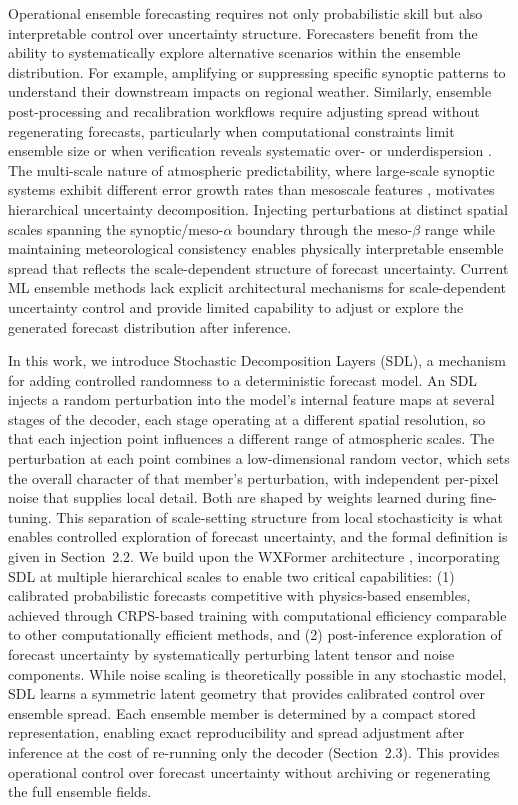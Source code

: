 \documentclass{agujournal2019}
\begin{document}
Operational ensemble forecasting requires not only probabilistic skill but also interpretable control over uncertainty structure. Forecasters benefit from the ability to systematically explore alternative scenarios within the ensemble distribution. For example, amplifying or suppressing specific synoptic patterns to understand their downstream impacts on regional weather. Similarly, ensemble post-processing and recalibration workflows require adjusting spread without regenerating forecasts, particularly when computational constraints limit ensemble size or when verification reveals systematic over- or underdispersion \cite{hamill1997verification, vannitsem2021statistical}. The multi-scale nature of atmospheric predictability, where large-scale synoptic systems exhibit different error growth rates than mesoscale features \cite{tribbia2004scale}, motivates hierarchical uncertainty decomposition. Injecting perturbations at distinct spatial scales spanning the synoptic/meso-$\alpha$ boundary through the meso-$\beta$ range while maintaining meteorological consistency enables physically interpretable ensemble spread that reflects the scale-dependent structure of forecast uncertainty. Current ML ensemble methods lack explicit architectural mechanisms for scale-dependent uncertainty control and provide limited capability to adjust or explore the generated forecast distribution after inference.

In this work, we introduce Stochastic Decomposition Layers (SDL), a mechanism for adding controlled randomness to a deterministic forecast model. An SDL injects a random perturbation into the model's internal feature maps at several stages of the decoder, each stage operating at a different spatial resolution, so that each injection point influences a different range of atmospheric scales. The perturbation at each point combines a low-dimensional random vector, which sets the overall character of that member's perturbation, with independent per-pixel noise that supplies local detail. Both are shaped by weights learned during fine-tuning. This separation of scale-setting structure from local stochasticity is what enables controlled exploration of forecast uncertainty, and the formal definition is given in Section~2.2. We build upon the WXFormer architecture \cite{schreck2025, chapman2025camulator}, incorporating SDL at multiple hierarchical scales to enable two critical capabilities: (1) calibrated probabilistic forecasts competitive with physics-based ensembles, achieved through CRPS-based training with computational efficiency comparable to other computationally efficient methods, and (2) post-inference exploration of forecast uncertainty by systematically perturbing latent tensor and noise components. While noise scaling is theoretically possible in any stochastic model, SDL learns a symmetric latent geometry that provides calibrated control over ensemble spread. Each ensemble member is determined by a compact stored representation, enabling exact reproducibility and spread adjustment after inference at the cost of re-running only the decoder (Section~2.3). This provides operational control over forecast uncertainty without archiving or regenerating the full ensemble fields.
\end{document}
